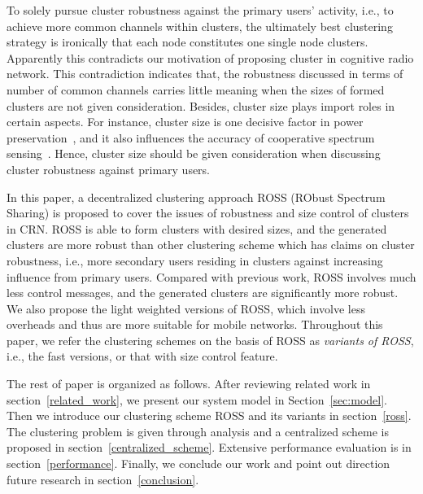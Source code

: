 \documentclass[10pt,journal,compsoc]{IEEEtran}
\theoremstyle{mytheoremstyle}
\theoremstyle{mytheoremstyle}
\theoremstyle{mytheoremstyle}
\newcommand{\ie}{i.e., }
\begin{document}
To solely pursue cluster robustness against the primary users' activity, \ie to achieve more common channels within clusters, the ultimately best clustering strategy is ironically that each node constitutes one single node clusters.
Apparently this contradicts our motivation of proposing cluster in cognitive radio network.
This contradiction indicates that, the robustness discussed in terms of number of common channels carries little meaning when the sizes of formed clusters are not given consideration.
Besides, cluster size plays import roles in certain aspects.
For instance, cluster size is one decisive factor in power preservation~\cite{clustering_globecom11, EnergyEfficientClusteringRouting_2015}, and it also influences the accuracy of cooperative spectrum sensing~\cite{Consensus_based_clustering12}.
Hence, cluster size should be given consideration when discussing cluster robustness against primary users.

In this paper, a decentralized clustering approach ROSS (RObust Spectrum Sharing) is proposed to cover the issues of robustness and size control of clusters in CRN.
ROSS is able to form clusters with desired sizes, and the generated clusters are more robust than other clustering scheme which has claims on cluster robustness, \ie more secondary users residing in clusters against increasing influence from primary users.
Compared with previous work, ROSS involves much less control messages, and the generated clusters are significantly more robust.
We also propose the light weighted versions of ROSS, which involve less overheads and thus are more suitable for mobile networks.
Throughout this paper, we refer the clustering schemes on the basis of ROSS as \textit{variants of ROSS}, \ie the fast versions, or that with size control feature.

The rest of paper is organized as follows. 
After reviewing related work in section~\ref{related_work}, we present our system model in Section~\ref{sec:model}. 
Then we introduce our clustering scheme ROSS and its variants in section~\ref{ross}.
The clustering problem is given through analysis and a centralized scheme is proposed in section~\ref{centralized_scheme}.
Extensive performance evaluation is in section~\ref{performance}.
Finally, we conclude our work and point out direction future research in section~\ref{conclusion}.
\end{document}
